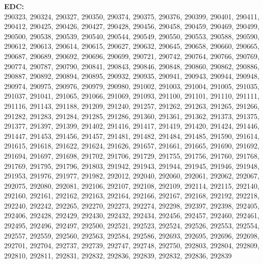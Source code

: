 \textbf{EDC:}\\
290323, 290324, 290327, 290350, 290374, 290375, 290376, 290399, 290401, 290411, 290412, 290425, 290426, 290427, 290428, 290456, 290458, 290459, 290469, 290499, 290500, 290538, 290539, 290540, 290544, 290549, 290550, 290553, 290588, 290590, 290612, 290613, 290614, 290615, 290627, 290632, 290645, 290658, 290660, 290665, 290687, 290689, 290692, 290696, 290699, 290721, 290742, 290764, 290766, 290769, 290774, 290787, 290790, 290841, 290843, 290846, 290848, 290860, 290862, 290886, 290887, 290892, 290894, 290895, 290932, 290935, 290941, 290943, 290944, 290948, 290974, 290975, 290976, 290979, 290980, 291002, 291003, 291004, 291005, 291035, 291037, 291041, 291065, 291066, 291069, 291093, 291100, 291101, 291110, 291111, 291116, 291143, 291188, 291209, 291240, 291257, 291262, 291263, 291265, 291266, 291282, 291283, 291284, 291285, 291286, 291360, 291361, 291362, 291373, 291375, 291377, 291397, 291399, 291402, 291416, 291417, 291419, 291420, 291424, 291446, 291447, 291453, 291456, 291457, 291481, 291482, 291484, 291485, 291590, 291614, 291615, 291618, 291622, 291624, 291626, 291657, 291661, 291665, 291690, 291692, 291694, 291697, 291698, 291702, 291706, 291729, 291755, 291756, 291760, 291768, 291769, 291795, 291796, 291803, 291942, 291943, 291944, 291945, 291946, 291948, 291953, 291976, 291977, 291982, 292012, 292040, 292060, 292061, 292062, 292067, 292075, 292080, 292081, 292106, 292107, 292108, 292109, 292114, 292115, 292140, 292160, 292161, 292162, 292163, 292164, 292166, 292167, 292168, 292192, 292218, 292240, 292242, 292265, 292270, 292273, 292274, 292298, 292397, 292398, 292405, 292406, 292428, 292429, 292430, 292432, 292434, 292456, 292457, 292460, 292461, 292495, 292496, 292497, 292500, 292521, 292523, 292524, 292526, 292553, 292554, 292557, 292559, 292560, 292563, 292584, 292586, 292693, 292695, 292696, 292698, 292701, 292704, 292737, 292739, 292747, 292748, 292750, 292803, 292804, 292809, 292810, 292811, 292831, 292832, 292836, 292839, 292832, 292836, 292839 \\

